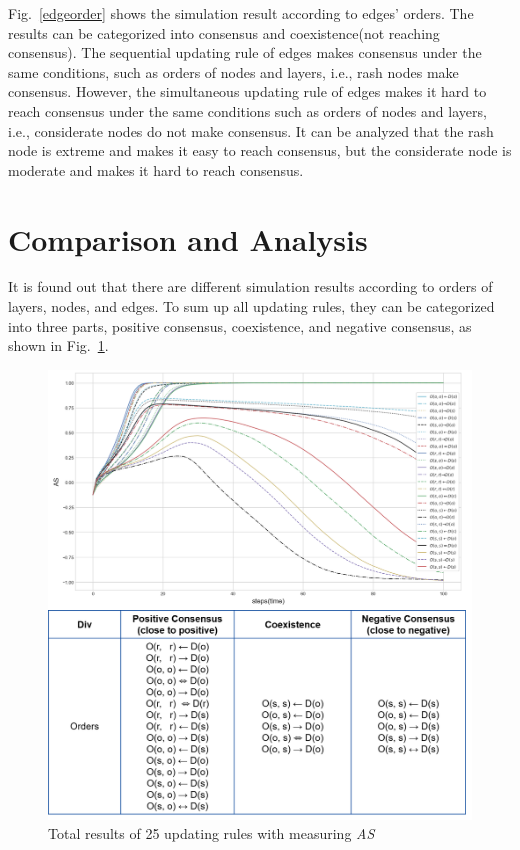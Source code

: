 Fig.~\ref{edgeorder} shows the simulation result according to edges' orders. The results can be categorized into consensus and coexistence(not reaching consensus). The sequential updating rule of edges makes consensus under the same conditions, such as orders of nodes and layers, i.e., rash nodes make consensus. However, the simultaneous updating rule of edges makes it hard to reach consensus under the same conditions such as orders of nodes and layers, i.e., considerate nodes do not make consensus. It can be analyzed that the rash node is extreme and makes it easy to reach consensus, but the considerate node is moderate and makes it hard to reach consensus.\\
 
\section{Comparison and Analysis}
It is found out that there are different simulation results according to orders of layers, nodes, and edges. To sum up all updating rules, they can be categorized into three parts, positive consensus, coexistence, and negative consensus, as shown in Fig.~\ref{ordertotal}. 
 
\begin{figure}[!htb]
	\centering
	\includegraphics[width=\hsize]{figure/chap4_ordertotal.png}
	\caption{Total results of 25 updating rules with measuring \textit{AS}}
	\label{ordertotal}
\end{figure}


